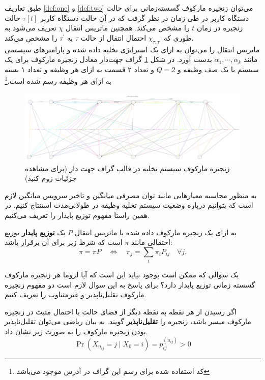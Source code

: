 طبق تعاریف \ref{def:one} و \ref{def:two} می‌توان زنجیره مارکوف گسسته‌زمانی برای حالت دستگاه کاربر در طی زمان در نظر گرفت که در آن حالت دستگاه کاربر $\tau[t]$ حالت زنجیره در زمان $t$ را مشخص می‌کند. همچنین ماتریس انتقال $\chi$ تعریف می‌شود به طوری که $\chi_{\tau, \tau^{\prime}}$ احتمال انتقال از حالت $\tau$ به \(\tau^{\prime}\) را مشخص می‌کند. \\

ماتریس انتقال را می‌توان به ازای یک استراتژی تخلیه داده شده و پارامترهای سیستمی مانند \(\alpha_1, \cdots, \alpha_k\) بدست آورد. در شکل \ref{fig:digraph} گراف جهت‌دار معادل زنجیره مارکوف برای یک سیستم با یک صف وظیفه و \(Q = 2\) و تعداد ۲ قسمت به ازای هر وظیفه و تعداد ۱ بسته به ازای هر وظیفه رسم شده است.\footnote{کد استفاده شده برای رسم این گراف در آدرس  موجود می‌باشد}
\begin{figure}[H]
\centering
\includegraphics[width=\textwidth]{figures/graph.pdf}
\caption[زنجیره مارکوف سیستم تخلیه در قالب گراف جهت دار]{
زنجیره مارکوف سیستم تخلیه در قالب گراف جهت دار (برای مشاهده جزئیات زوم کنید)
}
\label{fig:digraph}
\end{figure}
به منظور محاسبه معیارهایی مانند توان مصرفی میانگین و تاخیر سرویس میانگین لازم است که بتوانیم درباره وضعیت سیستم تخلیه وظیفه در طولانی‌مدت استنتاج کنیم. در همین راستا مفهوم توزیع پایدار را تعریف می‌کنیم.
\begin{defi}
به ازای یک زنجیره مارکوف داده شده با ماتریس انتقال \(P\) یک \textbf{توزیع پایدار} توزیع احتمالی مانند \(\pi\) است که شرط زیر برای آن برقرار باشد:
\begin{equation*}
	\pi=\pi P \quad \Longleftrightarrow \quad \pi_{j}=\sum_{i} \pi_{i} P_{i j} \quad \forall j .
\end{equation*}
\end{defi}
یک سوالی که ممکن است بوجود بیاید این است که آیا لزوما هر زنجیره مارکوف گسسته زمانی توزیع پایدار دارد؟ برای پاسخ به این سوال لازم است دو مفهوم زنجیره مارکوف تقلیل‌ناپذیر و غیرمتناوب را تعریف کنیم.
\begin{defi}
اگر رسیدن از هر نقطه به نقطه دیگر از فضای حالت با احتمال مثبت در زنجیره مارکوف میسر باشد، زنجیره را \textbf{تقلیل‌ناپذیر} گویند. به بیان ریاضی می‌توان تقلیل‌ناپذیر بودن زنجیره مارکوف را به صورت زیر نشان داد.
\begin{equation*}
	\operatorname{Pr}\left(X_{n_{i j}}=j \mid X_{0}=i\right)=p_{i j}^{\left(n_{i j}\right)}>0
\end{equation*}
\end{defi}

